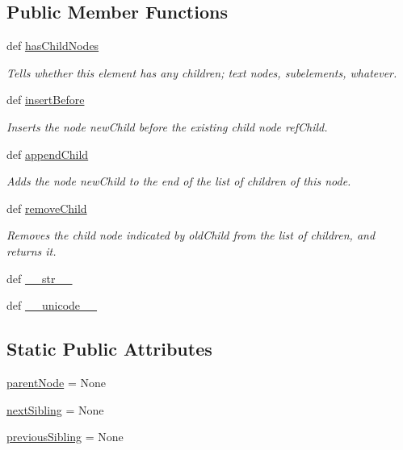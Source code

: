 \subsection*{Public Member Functions}
\begin{DoxyCompactItemize}
\item 
def \hyperlink{classodf_1_1element_1_1Node_a63cfdbf12489f500484956a118096260}{has\+Child\+Nodes}
\begin{DoxyCompactList}\small\item\em Tells whether this element has any children; text nodes, subelements, whatever. \end{DoxyCompactList}\item 
def \hyperlink{classodf_1_1element_1_1Node_a0fb7cc4a9d5e0686aa2d15269f5e9431}{insert\+Before}
\begin{DoxyCompactList}\small\item\em Inserts the node new\+Child before the existing child node ref\+Child. \end{DoxyCompactList}\item 
def \hyperlink{classodf_1_1element_1_1Node_a845962fddd860dcdf6ce48d5d6db398a}{append\+Child}
\begin{DoxyCompactList}\small\item\em Adds the node new\+Child to the end of the list of children of this node. \end{DoxyCompactList}\item 
def \hyperlink{classodf_1_1element_1_1Node_a9c175787513efaca98d15948c75d565e}{remove\+Child}
\begin{DoxyCompactList}\small\item\em Removes the child node indicated by old\+Child from the list of children, and returns it. \end{DoxyCompactList}\item 
def \hyperlink{classodf_1_1element_1_1Node_ab5187facfbbe9ec043d4263d53ea26fc}{\+\_\+\+\_\+str\+\_\+\+\_\+}
\item 
def \hyperlink{classodf_1_1element_1_1Node_ad858fce2149350fa73195586a9a7d3ed}{\+\_\+\+\_\+unicode\+\_\+\+\_\+}
\end{DoxyCompactItemize}
\subsection*{Static Public Attributes}
\begin{DoxyCompactItemize}
\item 
\hyperlink{classodf_1_1element_1_1Node_a9c0ce94d5fda3d35c448e01e7180324b}{parent\+Node} = None
\item 
\hyperlink{classodf_1_1element_1_1Node_a84fb62eaffb2cad956e5ce71fbe2c108}{next\+Sibling} = None
\item 
\hyperlink{classodf_1_1element_1_1Node_aa1ab10b7b12207015a51a3925bd2dd4d}{previous\+Sibling} = None
\end{DoxyCompactItemize}


